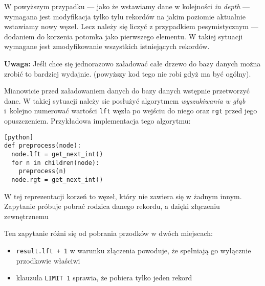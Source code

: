 W powyższym przypadku
--- jako że wstawiamy dane w kolejności \emph{in depth} ---
wymagana jest modyfikacja tylko tylu rekordów na jakim poziomie aktualnie wstawiamy nowy węzeł.
Lecz należy się liczyć z przypadkiem pesymistycznym --- dodaniem do korzenia potomka jako pierwszego elementu.
W takiej sytuacji wymagane jest zmodyfikowanie wszystkich istniejących rekordów.


\textbf{Uwaga:} Jeśli chce się jednorazowo załadować całe drzewo do bazy danych można zrobić to bardziej wydajnie.
(powyższy kod tego nie robi gdyż ma być ogólny).

Mianowicie przed załadowaniem danych do bazy danych wstępnie przetworzyć dane.
W takiej sytuacji należy sie posłużyć algorytmem \emph{wyszukiwania w głąb}
i~kolejno numerować wartości \texttt{lft} węzła po wejściu do niego oraz \texttt{rgt} przed jego opuszczeniem.
Przykładowa implementacja tego algorytmu:

\begin{verbatim}[python]
def preprocess(node):
  node.lft = get_next_int()
  for n in children(node):
    preprocess(n)
  node.rgt = get_next_int()
\end{verbatim}

%
%



W tej reprezentacji korzeń to węzeł, który nie zawiera się w żadnym innym.
Zapytanie próbuje pobrać rodzica danego rekordu, a dzięki złączeniu zewnętrznemu 



Ten zapytanie różni się od pobrania przodków w dwóch miejscach:
\begin{itemize}
    \item 
	\texttt{result.lft + 1} w warunku złączenia powoduje, że spełniają go wyłącznie przodkowie właściwi
    \item 
        klauzula \texttt{LIMIT 1} sprawia, że pobiera tylko jeden rekord 
\end{itemize}

